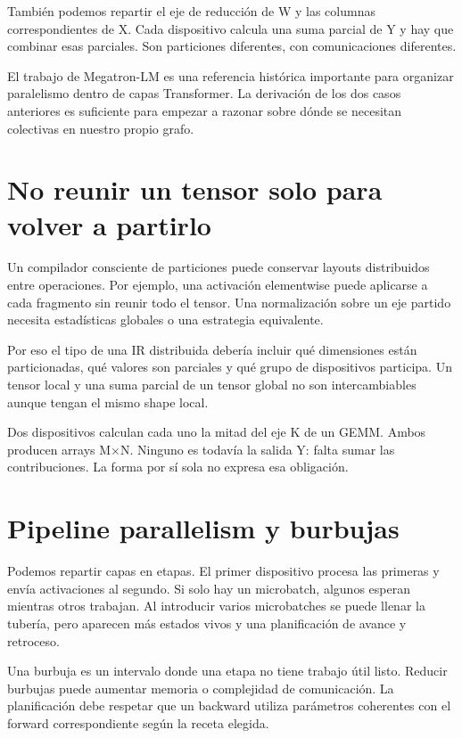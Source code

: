 \documentclass[12pt,a4paper,oneside]{report}
\begin{document}
También podemos repartir el eje de reducción de W y las columnas correspondientes de X. Cada dispositivo calcula una suma parcial de Y y hay que combinar esas parciales. Son particiones diferentes, con comunicaciones diferentes.

El trabajo de Megatron-LM es una referencia histórica importante para organizar paralelismo dentro de capas Transformer. La derivación de los dos casos anteriores es suficiente para empezar a razonar sobre dónde se necesitan colectivas en nuestro propio grafo. \cite{megatron}

\section{No reunir un tensor solo para volver a partirlo}
Un compilador consciente de particiones puede conservar layouts distribuidos entre operaciones. Por ejemplo, una activación elementwise puede aplicarse a cada fragmento sin reunir todo el tensor. Una normalización sobre un eje partido necesita estadísticas globales o una estrategia equivalente.

Por eso el tipo de una IR distribuida debería incluir qué dimensiones están particionadas, qué valores son parciales y qué grupo de dispositivos participa. Un tensor local y una suma parcial de un tensor global no son intercambiables aunque tengan el mismo shape local.

\begin{ejemplo}
Dos dispositivos calculan cada uno la mitad del eje K de un GEMM. Ambos producen arrays M\ensuremath{\times}N. Ninguno es todavía la salida Y: falta sumar las contribuciones. La forma por sí sola no expresa esa obligación.

\end{ejemplo}
\section{Pipeline parallelism y burbujas}
Podemos repartir capas en etapas. El primer dispositivo procesa las primeras y envía activaciones al segundo. Si solo hay un microbatch, algunos esperan mientras otros trabajan. Al introducir varios microbatches se puede llenar la tubería, pero aparecen más estados vivos y una planificación de avance y retroceso.

Una burbuja es un intervalo donde una etapa no tiene trabajo útil listo. Reducir burbujas puede aumentar memoria o complejidad de comunicación. La planificación debe respetar que un backward utiliza parámetros coherentes con el forward correspondiente según la receta elegida.
\end{document}
